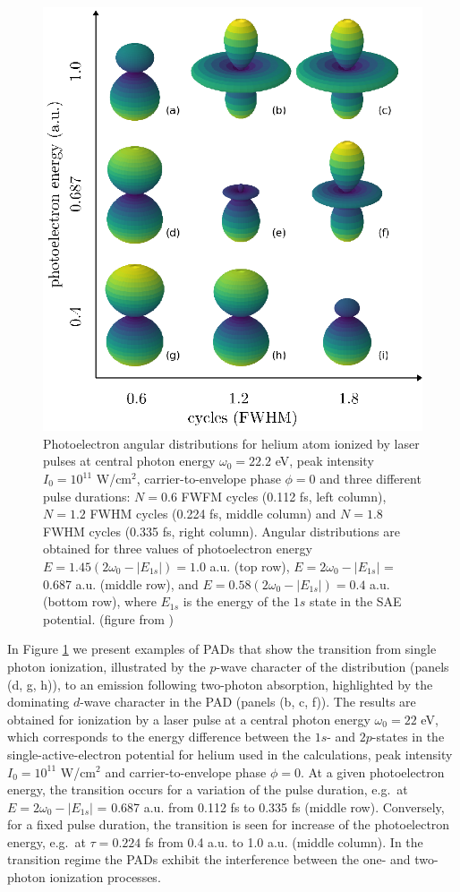 \begin{figure}[!ht]
\centering
\includegraphics[width=0.5\linewidth]{figs/Photo_ionization/short_pulse/fig_1.eps}
\caption{
Photoelectron angular distributions for helium atom ionized by laser pulses at central photon energy $\omega_0 = 22.2$ eV, peak intensity $I_0 = 10^{11}$ W/cm$^2$, carrier-to-envelope phase $\phi = 0$ and three different pulse durations: $N = 0.6$ FWFM cycles (0.112 fs, left column), $N = 1.2$ FWHM cycles (0.224 fs, middle column) and $N = 1.8$ FWHM cycles (0.335 fs, right column). Angular distributions are obtained for three values of photoelectron energy $E = 1.45(2\omega_0 - |E_{1s}|) = 1.0$ a.u. (top row), $E = 2\omega_0 - |E_{1s}|$ = 0.687 a.u. (middle row), and $E = 0.58(2\omega_0 - |E_{1s}|) = 0.4$ a.u. (bottom row), where $E_{1s}$ is the energy of the $1s$ state in the SAE potential. (figure from \cite{venzke2020_ionization})
} 
  \label{fig:pads}
\end{figure}

In Figure \ref{fig:pads} we present examples of PADs that show the transition from single photon ionization, illustrated by the $p$-wave character of the distribution (panels (d, g, h)), to an emission following two-photon absorption, highlighted by the dominating $d$-wave character in the PAD (panels (b, c, f)). The results are obtained for ionization by a laser pulse at a central photon energy $\omega_0 = 22$ eV, which corresponds to the energy difference between the $1s$- and $2p$-states in the single-active-electron potential for helium used in the calculations, peak intensity $I_0 = 10^{11}$ W/cm$^2$ and carrier-to-envelope phase $\phi = 0$. At a given photoelectron energy, the transition occurs for a variation of the pulse duration, e.g.\ at $E = 2\omega_0 - |E_{1s}|$ = 0.687 a.u. from 0.112 fs to 0.335 fs (middle row). Conversely, for a fixed pulse duration, the transition is seen for increase of the photoelectron energy, e.g.\ at $\tau = 0.224$ fs from 0.4 a.u. to 1.0 a.u. (middle column). In the transition regime the PADs exhibit the interference between the one- and two-photon ionization processes. 


